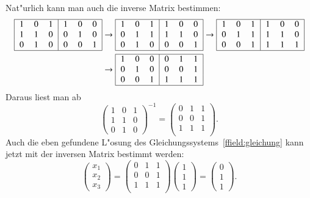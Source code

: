 Nat"urlich kann man auch die inverse Matrix bestimmen:
\begin{align*}
\begin{tabular}{|>{$}c<{$}>{$}c<{$}>{$}c<{$}|>{$}c<{$}>{$}c<{$}>{$}c<{$}|}
\hline
1&0&1&1&0&0\\
1&1&0&0&1&0\\
0&1&0&0&0&1\\
\hline
\end{tabular}
&
\rightarrow
\begin{tabular}{|>{$}c<{$}>{$}c<{$}>{$}c<{$}|>{$}c<{$}>{$}c<{$}>{$}c<{$}|}
\hline
1&0&1&1&0&0\\
0&1&1&1&1&0\\
0&1&0&0&0&1\\
\hline
\end{tabular}
\rightarrow
\begin{tabular}{|>{$}c<{$}>{$}c<{$}>{$}c<{$}|>{$}c<{$}>{$}c<{$}>{$}c<{$}|}
\hline
1&0&1&1&0&0\\
0&1&1&1&1&0\\
0&0&1&1&1&1\\
\hline
\end{tabular}
\\
&
\rightarrow
\begin{tabular}{|>{$}c<{$}>{$}c<{$}>{$}c<{$}|>{$}c<{$}>{$}c<{$}>{$}c<{$}|}
\hline
1&0&0&0&1&1\\
0&1&0&0&0&1\\
0&0&1&1&1&1\\
\hline
\end{tabular}
\end{align*}
Daraus liest man ab
\[
\begin{pmatrix}
1&0&1\\
1&1&0\\
0&1&0
\end{pmatrix}^{-1}
=
\begin{pmatrix}
0&1&1\\
0&0&1\\
1&1&1\\
\end{pmatrix}.
\]
Auch die eben gefundene L"osung des Gleichungssystems~\eqref{ffield:gleichung}
kann jetzt mit der inversen Matrix bestimmt werden:
\[
\begin{pmatrix}x_1\\x_2\\x_3\end{pmatrix}
=
\begin{pmatrix}
0&1&1\\
0&0&1\\
1&1&1\\
\end{pmatrix}
\begin{pmatrix}1\\1\\1\end{pmatrix}
=
\begin{pmatrix}0\\1\\1\end{pmatrix}.
\]

